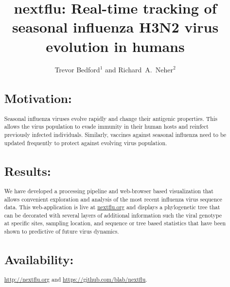 \documentclass{bioinfo}
\begin{document}
\title[Tracking of seasonal influenza H3N2 virus evolution]{nextflu: Real-time tracking of seasonal influenza H3N2 virus evolution in humans}
\author{Trevor Bedford$^{1}$ and Richard~A.~Neher$^{2}$} %
\address{$^{2}$Max Planck Institute for Developmental Biology, 72076 T\"ubingen,
Germany}


\maketitle



\begin{abstract} \section{Motivation:} Seasonal influenza viruses evolve
rapidly and change their antigenic properties. This allows the virus
population to evade immunity in their human hosts and reinfect previously
infected individuals. Similarly, vaccines against seasonal influenza need to
be updated frequently to protect against evolving virus population.

\section{Results:} We have developed a processing pipeline and web-browser
based visualization that allows convenient exploration and analysis of the
most recent influenza virus sequence data. This web-application is live at
\url{nextflu.org} and displays a phylogenetic tree that can be decorated with
several layers of additional information such the viral genotype at specific
sites, sampling location, and sequence or tree based statistics that have been
shown to predictive of future virus dynamics.

\section{Availability:} \url{http://nextflu.org} and \url{https://github.com/blab/nextflu}.
\end{abstract}
\end{document}
